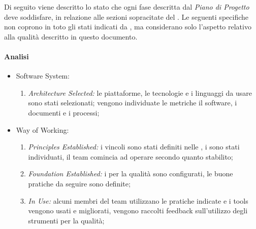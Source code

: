    Di seguito viene descritto lo stato che ogni fase descritta dal \emph{Piano di Progetto} deve soddisfare, in relazione alle sezioni sopracitate del . Le seguenti specifiche non coprono in toto gli stati indicati da , ma considerano solo l'aspetto relativo alla qualità descritto in questo documento.
   
   	\paragraph{Analisi}
    	\begin{itemize}
    		\item Software System:
    			\begin{enumerate}
    				\item \emph{Architecture Selected:} le piattaforme, le tecnologie e i linguaggi da usare sono stati selezionati; vengono individuate le metriche il software, i documenti e i processi;
    			\end{enumerate}
    		\item Way of Working:
    			\begin{enumerate}
    				\item \emph{Principles Established:} i vincoli sono stati definiti nelle \NormeDiProgetto, i  sono stati individuati, il team comincia ad operare secondo quanto stabilito;
    				\item \emph{Foundation Established:} i  per la qualità sono configurati, le buone pratiche da seguire sono definite;
    				\item \emph{In Use:} alcuni membri del team utilizzano le pratiche indicate e i tools vengono usati e migliorati, vengono raccolti feedback sull'utilizzo degli strumenti per la qualità;
    			\end{enumerate}
    	\end{itemize}
    	
